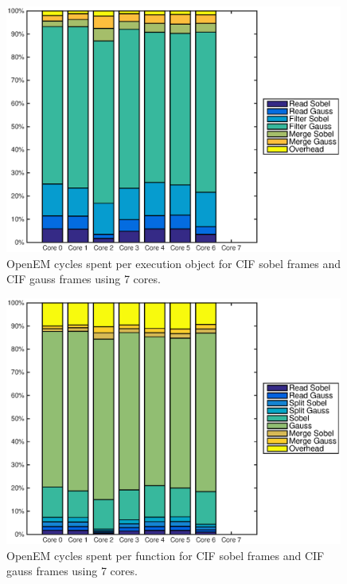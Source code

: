 \begin{figure}[h!]
    \begin{center}
        \includegraphics[width=0.99\textwidth]{images/openem_cifcif_7cores_eo.eps}
        \caption{OpenEM cycles spent per execution object for CIF sobel frames and CIF gauss frames using 7 cores.}
        \label{fig:oem7coreeo}
    \end{center}
\end{figure}

\begin{figure}[h!]
    \begin{center}
        \includegraphics[width=0.99\textwidth]{images/openem_cifcif_7cores_func.eps}
        \caption{OpenEM cycles spent per function for CIF sobel frames and CIF gauss frames using 7 cores.}
        \label{fig:oem7corefunc}
    \end{center}
\end{figure}


